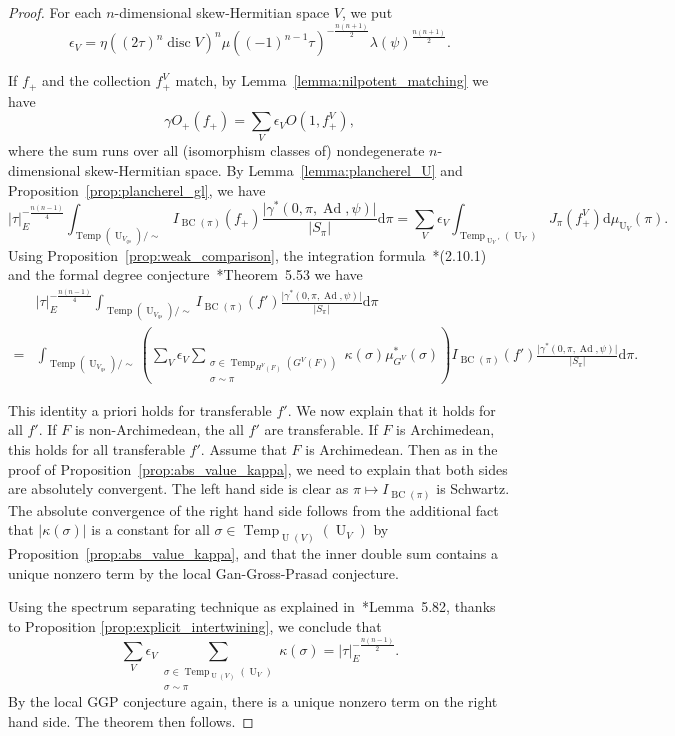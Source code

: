 \documentclass[letterpaper,11pt]{amsart}
\newcommand{\rd}{\mathrm{d}}
\newcommand{\<}{\negthickspace}
\providecommand{\abs}[1]{\lvert#1\rvert}
\DeclareMathOperator{\U}{U}
\DeclareMathOperator{\disc}{disc}
\DeclareMathOperator{\BC}{BC}
\DeclareMathOperator{\Ad}{Ad}
\DeclareMathOperator{\Temp}{Temp} \DeclareMathOperator{\temp}{temp}
\theoremstyle{definition}
\theoremstyle{plain}
\theoremstyle{remark}
\numberwithin{equation}{section}
\begin{document}
\begin{proof}
For each $n$-dimensional skew-Hermitian space $V$, we put
    \[
    \epsilon_V=\eta((2\tau)^n \disc V)^n
    \mu((-1)^{n-1} \tau)^{-\frac{n(n+1)}{2}}
    \lambda(\psi)^{\frac{n(n+1)}{2}}.
    \]


If $f_+$ and the collection $f_+^V$ match, by
Lemma~\ref{lemma:nilpotent_matching} we have
    \[
    \gamma
    O_+(f_+) =
    \sum_{V} \epsilon_V
    O(1, f_+^V),
    \]
where the sum runs over all (isomorphism classes of) nondegenerate $n$-dimensional
skew-Hermitian space. By Lemma~\ref{lemma:plancherel_U} and
Proposition~\ref{prop:plancherel_gl}, we have
    \[
    \abs{\tau}_E^{-\frac{n(n-1)}{4}}
    \int_{\Temp(\U_{V_{qs}})/\sim} I_{\BC(\pi)}(f_+)
    \frac{\abs{\gamma^*(0,\pi, \Ad, \psi)}}{\abs{S_{\pi}}}
    \rd \pi = \sum_V \epsilon_V
    \int_{\Temp_{\U_V'}(\U_V)}
    J_{\pi}(f_+^V) \rd \mu_{\U_V}(\pi).
    \]
Using Proposition~\ref{prop:weak_comparison}, the integration
formula~\cite{BP1}*{(2.10.1)} and the formal degree
conjecture~\cite{BP1}*{Theorem~5.53} we have
    \begin{equation}    \label{eq:final_comparison}
    \begin{aligned}
    &\abs{\tau}_E^{-\frac{n(n-1)}{4}}
    \int_{\Temp(\U_{V_{qs}})/\sim} I_{\BC(\pi)}(f')
    \frac{\abs{\gamma^*(0,\pi, \Ad, \psi)}}{\abs{S_{\pi}}}
    \rd \pi\\
    = & \int_{\Temp(\U_{V_{qs}})/\sim} \left( \sum_V \epsilon_V
    \sum_{\substack{\sigma \in \Temp_{H^V(F)}(G^V(F))\\
    \sigma \sim \pi}} \kappa(\sigma) \mu^*_{G^V}(\sigma) \right)
    I_{\BC(\pi)}(f') \frac{\abs{\gamma^*(0,\pi, \Ad, \psi)}}{\abs{S_{\pi}}}
    \rd \pi.
    \end{aligned}
    \end{equation}

This identity a priori holds for transferable $f'$. We now explain that it
holds for all $f'$. If $F$ is non-Archimedean, the all $f'$ are transferable.
If $F$ is Archimedean, this holds for all transferable $f'$. Assume that $F$
is Archimedean. Then as in the proof of
Proposition~\ref{prop:abs_value_kappa}, we need to explain that both sides
are absolutely convergent. The left hand side is clear as $\pi \mapsto
I_{\BC(\pi)}$ is Schwartz. The absolute convergence of the right hand side follows
from the additional fact that $\abs{\kappa(\sigma)}$ is a constant for all
$\sigma \in \Temp_{\U(V)}(\U_V)$ by Proposition~\ref{prop:abs_value_kappa},
and that the inner double sum contains a unique nonzero term by the local
Gan-Gross-Prasad conjecture.

Using the spectrum separating technique as explained
in~\cite{BP1}*{Lemma~5.82}, thanks to Proposition
\ref{prop:explicit_intertwining}, we conclude that
    \[
    \sum_V \epsilon_V
    \sum_{\substack{\sigma \in \Temp_{\U(V)}(\U_V)\\
    \sigma \sim \pi}} \kappa(\sigma) =
    \abs{\tau}_E^{-\frac{n(n-1)}{2}}.
    \]
By the local GGP conjecture again, there is a unique nonzero term on the
right hand side. The theorem then follows.
\end{proof}
\end{document}
